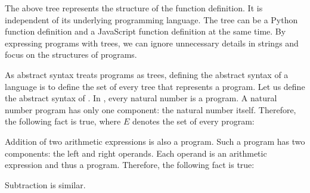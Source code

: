 The above tree represents the structure of the function definition. It is
independent of its underlying programming language. The tree can be a Python
function definition and a JavaScript function definition at the same time. By
expressing programs with trees, we can ignore unnecessary details in strings and
focus on the structures of programs.

As abstract syntax treats programs as trees, defining the abstract syntax of a
language is to define the set of every tree that represents a program. Let us
define the abstract syntax of \lang. In \lang, every natural number is a
program. A natural number program has only one component: the natural number
itself. Therefore, the following fact is true, where $E$ denotes the set of
every program:

\begin{center}
\end{center}

Addition of two arithmetic expressions is also a program. Such a program has
two components: the left and right operands. Each operand is an arithmetic
expression and thus a program. Therefore, the following fact is true:

\begin{center}
\end{center}

Subtraction is similar.

\begin{center}
\end{center}

